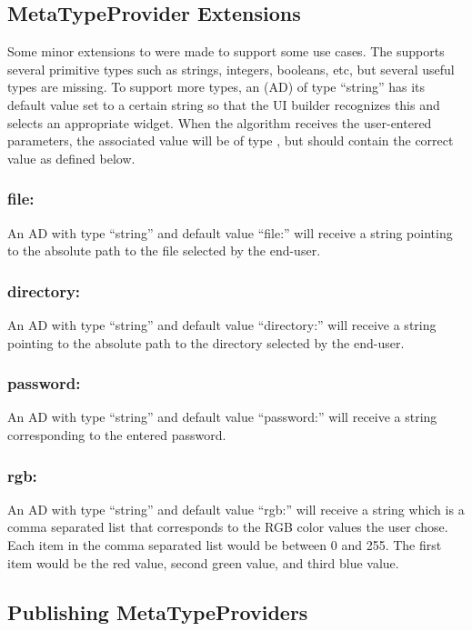 \subsection{MetaTypeProvider Extensions}

Some minor extensions to  were made to support some use
cases. The  supports several primitive types such as
strings, integers, booleans, etc, but several useful types are missing. To
support more types, an  (AD) of type ``string'' has
its default value set to a certain string so that the UI builder recognizes this
and selects an appropriate widget. When the algorithm receives the user-entered
parameters, the associated value will be of type , but
should contain the correct value as defined below.

\subsubsection*{file:}
An AD with type ``string'' and default value ``file:'' will receive a string
pointing to the absolute path to the file selected by the end-user.

\subsubsection*{directory:}
An AD with type ``string'' and default value ``directory:'' will receive a string
pointing to the absolute path to the directory selected by the end-user.

\subsubsection*{password:}
An AD with type ``string'' and default value ``password:'' will receive a string
corresponding to the entered password.

\subsubsection*{rgb:} 
An AD with type ``string'' and default value ``rgb:'' will
receive a string which is a comma separated list that corresponds to the RGB
color values the user chose. Each item in the comma separated list would be
between 0 and 255. The first item would be the red value, second green value,
and third blue value.

\subsection{Publishing MetaTypeProviders}

